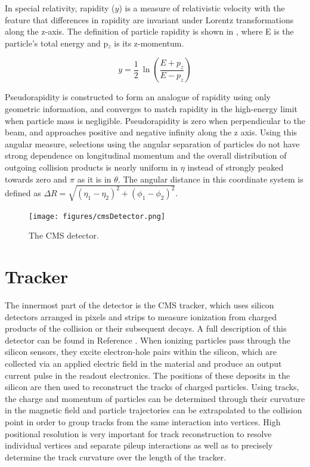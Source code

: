 In special relativity, rapidity ($y$) is a measure of relativistic velocity with the feature that differences in rapidity are invariant under Lorentz transformations along the z-axis.
The definition of particle rapidity is shown in , where E is the particle's total energy and p$_z$ is its z-momentum.

\begin{equation}
    \label{eq:rapidity}
    y = \frac{1}{2} ~\ln \left(\frac{E+p_z}{E-p_z}\right)
\end{equation}

Pseudorapidity is constructed to form an analogue of rapidity using only geometric information, and converges to match rapidity in the high-energy limit when particle mass is negligible.
Pseudorapidity is zero when perpendicular to the beam, and approaches positive and negative infinity along the z axis. 
Using this angular measure, selections using the angular separation of particles do not have strong dependence on longitudinal momentum and the overall distribution of outgoing collision products is nearly uniform in $\eta$ instead of strongly peaked towards zero and $\pi$ as it is in $\theta$.  
The angular distance in this coordinate system is defined as $\Delta R = \sqrt{(\eta_1-\eta_2)^2+(\phi_1-\phi_2)^2}$.

\begin{figure}[htpb]
    \texttt{[image: figures/cmsDetector.png]}
    \centering
    \caption{The CMS detector.}
    \label{fig:detector}
\end{figure}

\section{Tracker}
The innermost part of the detector is the CMS tracker, which uses silicon detectors arranged in pixels and strips to measure ionization from charged products of the collision or their subsequent decays. 
A full description of this detector can be found in Reference \cite{trackerTDR}.
When ionizing particles pass through the silicon sensors, they excite electron-hole pairs within the silicon, which are collected via an applied electric field in the material and produce an output current pulse in the readout electronics.
The positions of these deposits in the silicon are then used to reconstruct the tracks of charged particles.
Using tracks, the charge and momentum of particles can be determined through their curvature in the magnetic field and particle trajectories can be extrapolated to the collision point in order to group tracks from the same interaction into vertices. 
High positional resolution is very important for track reconstruction to resolve individual vertices and separate pileup interactions as well as to precisely determine the track curvature over the length of the tracker. 

